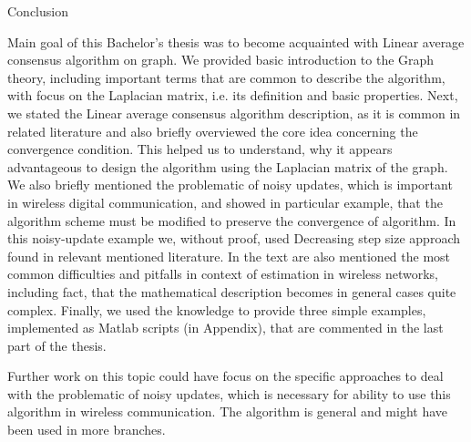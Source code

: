 \chap Conclusion

Main goal of this Bachelor's thesis was to become acquainted with Linear average consensus algorithm on graph. We provided basic introduction to the Graph theory, including important terms that are common to describe the algorithm, with focus on the Laplacian matrix, i.e. its definition and basic properties. Next, we stated the Linear average consensus algorithm description, as it is common in related literature and also briefly overviewed the core idea concerning the convergence condition. This helped us to understand, why it appears advantageous to design the algorithm using the Laplacian matrix of the graph. We also briefly mentioned the problematic of noisy updates, which is important in wireless digital communication, and showed in particular example, that the algorithm scheme must be modified to preserve the convergence of algorithm. In this noisy-update example we, without proof, used Decreasing step size approach found in relevant mentioned literature. In the text are also mentioned the most common difficulties and pitfalls in context of estimation in wireless networks, including fact, that the mathematical description becomes in general cases quite complex. Finally, we used the knowledge to provide three simple examples, implemented as Matlab scripts (in Appendix), that are commented in the last part of the thesis.  

Further work on this topic could have focus on the specific approaches to deal with the problematic of noisy updates, which is necessary for ability to use this algorithm in wireless communication. The algorithm is general and might have been used in more branches.


